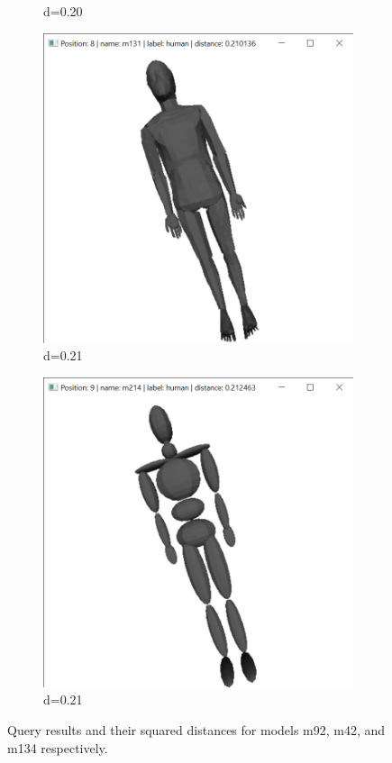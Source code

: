 \documentclass{bigdata}
\begin{document}
\begin{figure}[h!]
\begin{subfigure}[b]{0.09\linewidth}
    \caption*{d=0.20}
  \end{subfigure}
  \begin{subfigure}[b]{0.09\linewidth}
    \includegraphics[width=\linewidth]{Pictures/Evaluation/m134/pos8.png}
    \caption*{d=0.21}
  \end{subfigure}
  \begin{subfigure}[b]{0.09\linewidth}
    \includegraphics[width=\linewidth]{Pictures/Evaluation/m134/pos9.png}
    \caption*{d=0.21}
  \end{subfigure}
  \caption{Query results and their squared distances for models m92, m42, and m134 respectively.}
  \label{fig:qresults}
\end{figure}
\end{document}

